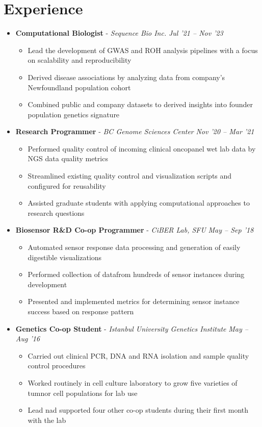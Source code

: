 \documentclass{article}
\newcommand{\experienceheader}[3]{\item \textbf{#1} - \textit{#2} \hfill \textit{#3} \vspace{-.2em}}
\newcommand{\customsection}[1]{\section*{#1} \vspace{-1em} \hrulefill \vspace{-.5em}}
\begin{document}
\customsection{Experience}
\begin{itemize}
  \experienceheader{Computational Biologist}{Sequence Bio Inc.}{Jul '21 -- Nov '23}
    \begin{itemize}
      \item Lead the development of GWAS and ROH analysis pipelines with a focus on scalability and reproducibility
      \item Derived disease associations by analyzing data from company's Newfoundland population cohort
      \item Combined public and company datasets to derived insights into founder population genetics signature
    \end{itemize}
  \experienceheader{Research Programmer}{BC Genome Sciences Center}{Nov '20 -- Mar '21}
    \begin{itemize}
      \item Performed quality control of incoming clinical oncopanel wet lab data by NGS data quality metrics
      \item Streamlined existing quality control and visualization scripts and configured for reusability
      \item Assisted graduate students with applying computational approaches to research questions
    \end{itemize}
  \experienceheader{Biosensor R\&D Co-op Programmer}{CiBER Lab, SFU}{May -- Sep '18}
    \begin{itemize}
      \item Automated sensor response data processing and generation of easily digestible visualizations
      \item Performed collection of datafrom hundreds of sensor instances during development
      \item Presented and implemented metrics for determining sensor instance success based on response pattern
    \end{itemize}
  \experienceheader{Genetics Co-op Student}{Istanbul University Genetics Institute}{May -- Aug '16}
    \begin{itemize}
      \item Carried out clinical PCR, DNA and RNA isolation and sample quality control procedures
      \item Worked routinely in cell culture laboratory to grow five varieties of tumnor cell populations for lab use
      \item Lead nad supported four other co-op students during their first month with the lab
    \end{itemize}
\end{itemize}
\end{document}
